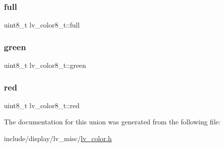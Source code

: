 \mbox{\label{unionlv__color8__t_a6f95b496bba6bb7b79d7322551219ba7}} 
\subsubsection{\texorpdfstring{full}{full}}
{\footnotesize\ttfamily uint8\+\_\+t lv\+\_\+color8\+\_\+t\+::full}

\mbox{\label{unionlv__color8__t_a77f8631c3f09bbf7f6d96c8415085517}} 
\subsubsection{\texorpdfstring{green}{green}}
{\footnotesize\ttfamily uint8\+\_\+t lv\+\_\+color8\+\_\+t\+::green}

\mbox{\label{unionlv__color8__t_abed658f0eaf8cee7278869ad88246d68}} 
\subsubsection{\texorpdfstring{red}{red}}
{\footnotesize\ttfamily uint8\+\_\+t lv\+\_\+color8\+\_\+t\+::red}



The documentation for this union was generated from the following file\+:\begin{DoxyCompactItemize}
\item 
include/display/lv\+\_\+misc/\mbox{\hyperlink{lv__color_8h}{lv\+\_\+color.\+h}}\end{DoxyCompactItemize}
